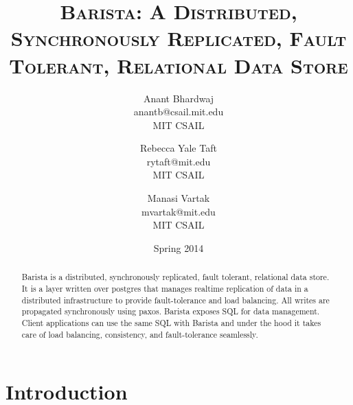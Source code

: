 \documentclass[a4paper]{article}
\title{\textsc{Barista: A Distributed, Synchronously Replicated, Fault Tolerant, Relational Data Store}}
\author{Anant Bhardwaj \\ anantb@csail.mit.edu \\ MIT CSAIL \and Rebecca Yale Taft \\ rytaft@mit.edu \\ MIT CSAIL \and Manasi Vartak \\ mvartak@mit.edu \\ MIT CSAIL}
\date{Spring 2014}
\begin{document}
\maketitle

\begin{abstract}
Barista is a distributed, synchronously replicated, fault tolerant, relational data store. It is a layer written over postgres that manages realtime replication of data in a distributed infrastructure to provide fault-tolerance and load balancing. All writes are propagated synchronously using paxos. Barista exposes SQL for data management. Client applications can use the same SQL with Barista and under the hood it takes care of load balancing, consistency, and fault-tolerance seamlessly.
\end{abstract}
\section{Introduction}
\end{document}
